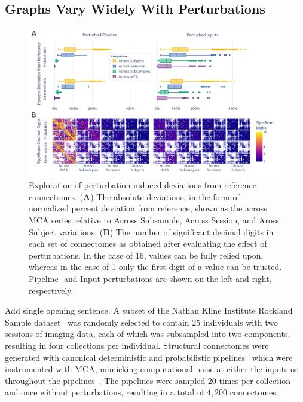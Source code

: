 \documentclass[fleqn,10pt]{SelfArx} %
\begin{document}
\subsection*{Graphs Vary Widely With Perturbations}
\begin{figure}[hbt]\centering
\includegraphics[width=0.98\linewidth]{figures/fig1_absolute_differences.pdf}
\caption{Exploration of perturbation-induced deviations from reference connectomes.
(\textbf{A}) The absolute deviations, in the form of normalized percent deviation from reference, shown as the
across MCA series relative to Across Subsample, Across Session, and Aross Subject variations.
(\textbf{B}) The number of significant decimal digits in each set of connectomes as obtained after evaluating the
effect of perturbations. In the case of 16, values can be fully relied upon, whereas in the case of 1 only the first
digit of a value can be trusted. Pipeline- and Input-perturbations are shown on the left and right, respectively.}
\label{fig:absolute}
\end{figure}

{\color{red} Add single opening sentence}.
A subset of the Nathan Kline Institute Rockland Sample dataset~\cite{Nooner2012-eg} was randomly selected to contain
$25$ individuals with two sessions of imaging data, each of which was subsampled into two components, resulting in four
collections per individual. Structural connectomes were generated with canonical deterministic and probabilistic
pipelines~\cite{Garyfallidis2014-ql,Garyfallidis2012-gg} which were instrumented with MCA, mimicking computational
noise at either the inputs or throughout the pipelines~\cite{Denis2016-wo,Kiar2020-lb}. The pipelines were sampled $20$
times per collection and once without perturbations, resulting in a total of $4,200$ connectomes.
\end{document}
